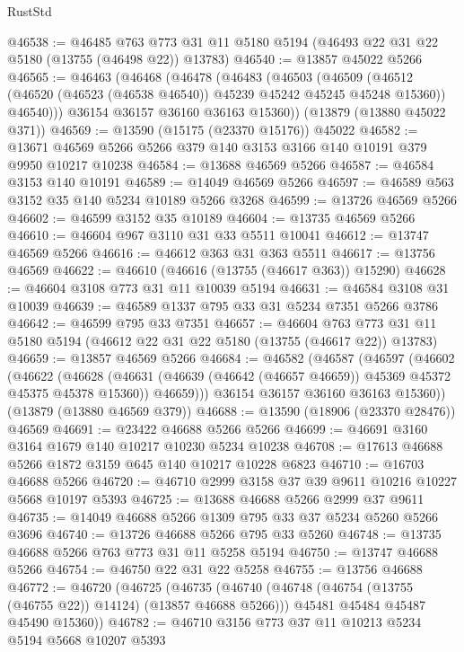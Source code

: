 \begin{lexlean}{RustStd}
\begin{coremodule}
@46538 := @46485
    @763
    @773
    @31
    @11
    @5180
    @5194
    (@46493 @22 @31 @22 @5180 (@13755 (@46498 @22)) @13783)
@46540 := @13857 @45022 @5266
@46565 := @46463
    (@46468
      (@46478
        (@46483
          (@46503
            (@46509
              (@46512 (@46520 (@46523 (@46538 @46540)) @45239 @45242 @45245 @45248 @15360))
              @46540)))
        @36154
        @36157
        @36160
        @36163
        @15360))
    (@13879 (@13880 @45022 @371))
@46569 := @13590 (@15175 (@23370 @15176)) @45022
@46582 := @13671 @46569 @5266 @5266 @379 @140 @3153 @3166 @140 @10191 @379 @9950 @10217 @10238
@46584 := @13688 @46569 @5266
@46587 := @46584 @3153 @140 @10191
@46589 := @14049 @46569 @5266
@46597 := @46589 @563 @3152 @35 @140 @5234 @10189 @5266 @3268
@46599 := @13726 @46569 @5266
@46602 := @46599 @3152 @35 @10189
@46604 := @13735 @46569 @5266
@46610 := @46604 @967 @3110 @31 @33 @5511 @10041
@46612 := @13747 @46569 @5266
@46616 := @46612 @363 @31 @363 @5511
@46617 := @13756 @46569
@46622 := @46610 (@46616 (@13755 (@46617 @363)) @15290)
@46628 := @46604 @3108 @773 @31 @11 @10039 @5194
@46631 := @46584 @3108 @31 @10039
@46639 := @46589 @1337 @795 @33 @31 @5234 @7351 @5266 @3786
@46642 := @46599 @795 @33 @7351
@46657 := @46604
    @763
    @773
    @31
    @11
    @5180
    @5194
    (@46612 @22 @31 @22 @5180 (@13755 (@46617 @22)) @13783)
@46659 := @13857 @46569 @5266
@46684 := @46582
    (@46587
      (@46597
        (@46602
          (@46622
            (@46628
              (@46631 (@46639 (@46642 (@46657 @46659)) @45369 @45372 @45375 @45378 @15360))
              @46659)))
        @36154
        @36157
        @36160
        @36163
        @15360))
    (@13879 (@13880 @46569 @379))
@46688 := @13590 (@18906 (@23370 @28476)) @46569
@46691 := @23422 @46688 @5266 @5266
@46699 := @46691 @3160 @3164 @1679 @140 @10217 @10230 @5234 @10238
@46708 := @17613 @46688 @5266 @1872 @3159 @645 @140 @10217 @10228 @6823
@46710 := @16703 @46688 @5266
@46720 := @46710 @2999 @3158 @37 @39 @9611 @10216 @10227 @5668 @10197 @5393
@46725 := @13688 @46688 @5266 @2999 @37 @9611
@46735 := @14049 @46688 @5266 @1309 @795 @33 @37 @5234 @5260 @5266 @3696
@46740 := @13726 @46688 @5266 @795 @33 @5260
@46748 := @13735 @46688 @5266 @763 @773 @31 @11 @5258 @5194
@46750 := @13747 @46688 @5266
@46754 := @46750 @22 @31 @22 @5258
@46755 := @13756 @46688
@46772 := @46720
    (@46725
      (@46735
        (@46740 (@46748 (@46754 (@13755 (@46755 @22)) @14124) (@13857 @46688 @5266)))
        @45481
        @45484
        @45487
        @45490
        @15360))
@46782 := @46710 @3156 @773 @37 @11 @10213 @5234 @5194 @5668 @10207 @5393

\end{coremodule}
\end{lexlean}

